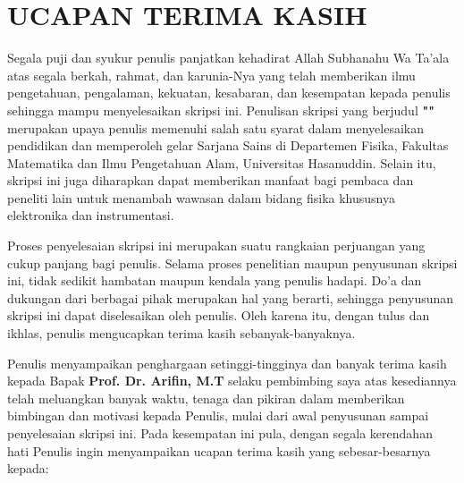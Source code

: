\begingroup
\chapter*{UCAPAN TERIMA KASIH}

\noindent
Segala puji dan syukur penulis panjatkan kehadirat Allah Subhanahu Wa
Ta’ala atas segala berkah, rahmat, dan karunia-Nya yang telah
memberikan ilmu pengetahuan, pengalaman, kekuatan, kesabaran, dan
kesempatan kepada penulis sehingga mampu menyelesaikan skripsi ini.
Penulisan skripsi yang berjudul \textbf{"\JudulSkripsi"} merupakan
upaya penulis memenuhi salah satu syarat dalam menyelesaikan pendidikan dan
memperoleh gelar Sarjana Sains di Departemen Fisika, Fakultas
Matematika dan Ilmu Pengetahuan Alam, Universitas Hasanuddin. Selain
itu, skripsi ini juga diharapkan dapat memberikan manfaat bagi
pembaca dan peneliti lain untuk menambah wawasan dalam bidang fisika
khususnya elektronika dan instrumentasi.

Proses penyelesaian skripsi ini merupakan suatu rangkaian perjuangan
yang cukup panjang bagi penulis. Selama proses penelitian maupun
penyusunan skripsi ini, tidak sedikit hambatan maupun kendala yang
penulis hadapi. Do’a dan dukungan dari berbagai pihak merupakan hal
yang berarti, sehingga penyusunan skripsi ini dapat diselesaikan oleh
penulis. Oleh karena itu, dengan tulus dan ikhlas, penulis
mengucapkan terima kasih sebanyak-banyaknya.

Penulis menyampaikan penghargaan setinggi-tingginya dan banyak terima
kasih kepada Bapak \textbf{Prof. Dr. Arifin, M.T} selaku pembimbing saya atas
kesediannya telah meluangkan banyak waktu, tenaga dan pikiran dalam
memberikan bimbingan dan motivasi kepada Penulis, mulai dari awal
penyusunan sampai penyelesaian skripsi ini. Pada kesempatan ini pula,
dengan segala kerendahan hati Penulis ingin menyampaikan ucapan
terima kasih yang sebesar-besarnya kepada:

